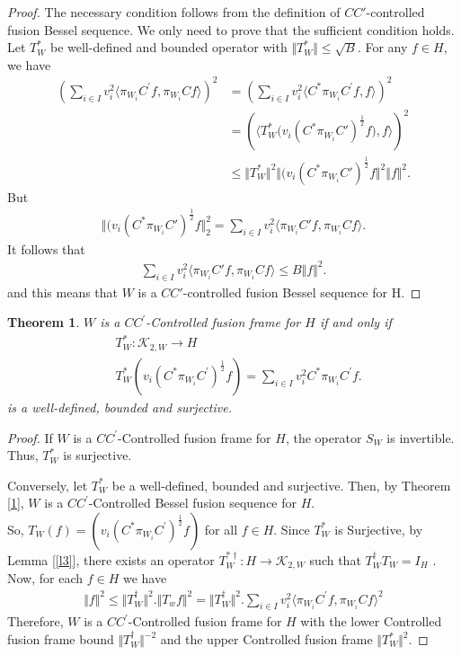 \documentclass{mfatshort}
\newtheorem{theorem}{Theorem}[section]
\begin{document}
\begin{proof}
The necessary condition follows from the definition of $CC'$-controlled fusion Bessel sequence. We only need to prove that the sufficient condition holds. Let $T^{*} _{W}$ be well-defined and bounded operator with $\Vert T^{*}_{W} \Vert \leq  \sqrt{B}$. For any $f\in H$, we have
\begin{align*}
(\sum_{i \in I} v_{i} ^{2} \langle  \pi_{W_{i}}C^{\prime}f,  \pi_{W_{i}} Cf \rangle )^{2}&=(\sum_{i\in I} v_{i} ^{2} \langle C^{*}\pi_{W_{i}}  C^{\prime}f,f \rangle )^{2}\\
&= (\langle T^{*}_{W}\big(v_i(C^{*}  \pi_{W_{i}} C')^{\frac{1}{2}}f\big), f \rangle )^2\\
&\leq \Vert T^{*}_{W}\Vert ^{2} \Vert (v_i(C^{*}\pi_{W_{i}}   C')^{\frac{1}{2}} f \Vert ^{2} \Vert f \Vert ^{2}.
\end{align*}
But
\begin{align*}
\Vert (v_i(C^{*}  \pi_{W_{i}} C')^{\frac{1}{2}} f\Vert_{2} ^{2}=\sum _{i \in I} v_{i}^{2}\langle \pi_{W_{i}}  C'f,\pi _{W_{i}} C f\rangle.
\end{align*}
It follows that
\begin{align*}
\sum _{i \in I} v_{i}^{2}\langle \pi_{W_{i}}  C'f,\pi _{W_{i}} C f\rangle\leq B\Vert f\Vert ^{2}.
\end{align*}
and this means that $W$ is a  $CC'$-controlled fusion Bessel sequence for H.
\end{proof}
\begin{theorem}\label{2}
$W$ is a $CC^{\prime}$-Controlled fusion frame  for $H$ if and only if 
\begin{align*}
&T^{*}_{W}:\mathcal{K}_{2,W} \rightarrow H \\
&T ^{*}_{W}(v_i(C^{*}\pi_{W_{i}} C^{\prime})^{\frac{1}{2}}f)=\sum _{i\in I} v_{i}^{2}C^{*}\pi_{W_{i}} C^{\prime}f.
\end{align*}
is a well-defined, bounded and surjective.
\end{theorem}
\begin{proof}
If $W$ is a $CC^{\prime}$-Controlled fusion frame  for $H$, the operator $S_{W}$ is invertible. Thus, $T^{*}_{W}$ is surjective. 

Conversely, let $T^{*}_{W}$ be a well-defined, bounded and surjective. Then, by Theorem \ref{1}, $W$ is a $CC^{\prime}$-Controlled Bessel fusion sequence for $H$.\\
So, $T_{W}(f)=(v_{i}(C^{*}\pi_{W_{i}}C^{\prime})^{\frac{1}{2}}f)$ for all $f \in H$. Since $T^{*}_{W}$  is Surjective, by Lemma [\ref{l3}], there exists an operator $T^{*\dagger}_{W}:H \rightarrow \mathcal{K}_{2,W}$ such that $T^{\dagger}_{W} T_{W}=I_{H}$ . Now, for each $f\in H$ we have 
\begin{align*}
\Vert f\Vert^{2}\leq \Vert T^{\dagger}_{W}\Vert ^{2}.\Vert T_{w}f\Vert ^{2}=\Vert T^{\dagger}_{W}\Vert ^{2}.\sum _{i\in I} v_{i}^{2} \langle \pi_{W_{i}} C^{\prime}f,\pi_{W_{i}} Cf \rangle ^{2}
\end{align*}
Therefore, $W$ is a $CC^{\prime}$-Controlled fusion frame  for $H$ with the lower Controlled fusion frame bound  $\Vert T^{\dagger}_{W}\Vert ^{-2}$ and the upper Controlled fusion frame $\Vert T^{*}_{W}\Vert ^{2}$.
\end{proof}
\end{document}
